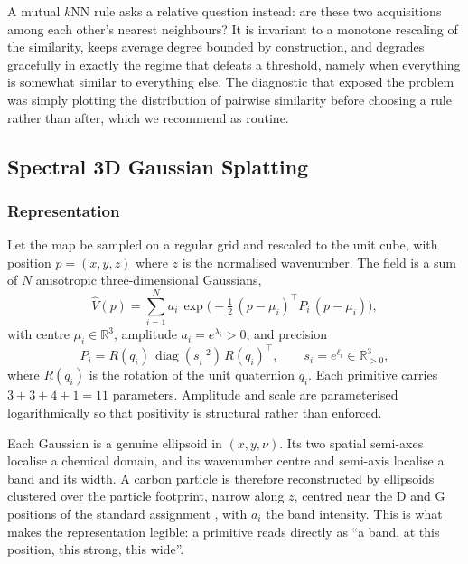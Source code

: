A mutual $k$NN rule asks a relative question instead: are these two
acquisitions among each other's nearest neighbours? It is invariant to a
monotone rescaling of the similarity, keeps average degree bounded by
construction, and degrades gracefully in exactly the regime that defeats a
threshold, namely when everything is somewhat similar to everything else. The
diagnostic that exposed the problem was simply plotting the distribution of
pairwise similarity before choosing a rule rather than after, which we
recommend as routine.


\subsection{Spectral 3D Gaussian Splatting}
\label{sec:s3dgs}

\subsubsection{Representation}

Let the map be sampled on a regular grid and rescaled to the unit cube, with
position $p=(x,y,z)$ where $z$ is the normalised wavenumber. The field is a sum
of $N$ anisotropic three-dimensional Gaussians,
\begin{equation}
\widehat{V}(p)=\sum_{i=1}^{N} a_i\,
\exp\!\Big(-\tfrac12\,(p-\mu_i)^{\!\top} P_i\,(p-\mu_i)\Big),
\label{eq:field}
\end{equation}
with centre $\mu_i\in\mathbb{R}^3$, amplitude $a_i=e^{\lambda_i}>0$, and
precision
\begin{equation}
P_i = R(q_i)\,\operatorname{diag}(s_i^{-2})\,R(q_i)^{\!\top},
\qquad s_i = e^{\ell_i}\in\mathbb{R}^3_{>0},
\end{equation}
where $R(q_i)$ is the rotation of the unit quaternion $q_i$. Each primitive
carries $3+3+4+1 = 11$ parameters. Amplitude and scale are parameterised
logarithmically so that positivity is structural rather than enforced.

Each Gaussian is a genuine ellipsoid in $(x,y,\nu)$. Its two spatial semi-axes
localise a chemical domain, and its wavenumber centre and semi-axis localise a
band and its width. A carbon particle is therefore reconstructed by ellipsoids
clustered over the particle footprint, narrow along $z$, centred near the D and
G positions of the standard assignment \cite{sadezky2005carbon}, with $a_i$
the band intensity. This is what makes the representation legible: a primitive
reads directly as ``a band, at this position, this strong, this wide''.

